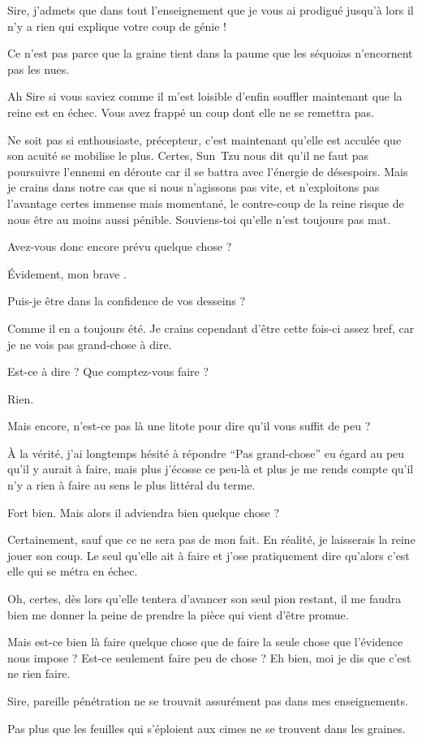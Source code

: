 \begin{drama}
  \alexasspeaks Sire, j’admets que dans tout l’enseignement que je vous ai prodigué jusqu’à lors il n’y a rien qui explique votre coup de génie !

  \elenaspeaks Ce n’est pas parce que la graine tient dans la paume que les séquoias n’encornent pas les nues.

  \alexasspeaks Ah Sire si vous saviez comme il m’est loisible d’enfin souffler maintenant que la reine est en échec. Vous avez frappé un coup dont elle ne se remettra pas.

  \elenaspeaks Ne soit pas si enthousiaste, précepteur, c’est maintenant qu’elle est acculée que son acuité se mobilise le plus. Certes, Sun~Tzu nous dit qu’il ne faut pas poursuivre l’ennemi en déroute car il se battra avec l’énergie de désespoirs. Mais je crains dans notre cas que si nous n’agissons pas vite, et n’exploitons pas l’avantage certes immense mais momentané, le contre-coup de la reine risque de nous être au moins aussi pénible. Souviens-toi qu’elle n’est toujours pas mat.

  \alexasspeaks Avez-vous donc encore prévu quelque chose ?

  \elenaspeaks Évidement, mon brave \alexas.

  \alexasspeaks Puis-je être dans la confidence de vos desseins ?

  \elenaspeaks Comme il en a toujours été. Je crains cependant d’être cette fois-ci assez bref, car je ne vois pas grand-chose à dire.

  \alexasspeaks Est-ce à dire ? Que comptez-vous faire ?

  \elenaspeaks Rien.

  \alexasspeaks Mais encore, n’est-ce pas là une litote pour dire qu’il vous suffit de peu ?

  \elenaspeaks À la vérité, j’ai longtemps hésité à répondre \enquote{Pas grand-chose} eu égard au peu qu’il y aurait à faire, mais plus j’écosse ce peu-là et plus je me rends compte qu’il n’y a rien à faire au sens le plus littéral du terme.

  \alexasspeaks Fort bien. Mais alors il adviendra bien quelque chose ?

  \elenaspeaks Certainement, sauf que ce ne sera pas de mon fait. En réalité, je laisserais la reine jouer son coup. Le seul qu’elle ait à faire et j’ose pratiquement dire qu’alors c’est elle qui se métra en échec.

  Oh, certes, dès lors qu’elle tentera d’avancer son seul pion restant, il me faudra bien me donner la peine de prendre la pièce qui vient d’être promue.

  Mais est-ce bien là faire quelque chose que de faire la seule chose que l’évidence nous impose ? Est-ce seulement faire peu de chose ? Eh bien, moi je dis que c’est ne rien faire.

  \alexasspeaks Sire, pareille pénétration ne se trouvait assurément pas dans mes enseignements.

  \elenaspeaks Pas plus que les feuilles qui s’éploient aux cimes ne se trouvent dans les graines.

\end{drama}

